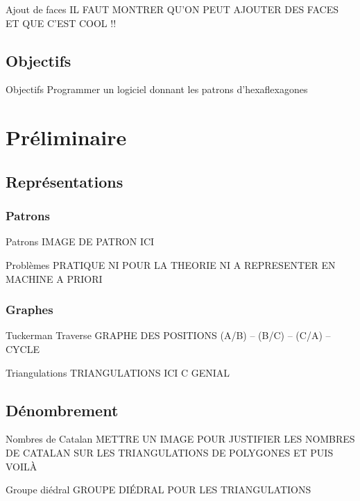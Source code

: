 \documentclass[french,xcolor=dvipsnames]{beamer}
\begin{document}
		\begin{frame}{Ajout de faces}
		IL FAUT MONTRER QU'ON PEUT AJOUTER DES FACES ET QUE C'EST COOL !!
		\end{frame}
		
		\subsection{Objectifs}
		\begin{frame}{Objectifs}
			Programmer un logiciel donnant les patrons d'hexaflexagones
		\end{frame}
		
		
	\section{Préliminaire}
	
		\subsection{Représentations}
		
		\subsubsection{Patrons}
		\begin{frame}{Patrons}
			IMAGE DE PATRON ICI
		\end{frame}
		
		\begin{frame}{Problèmes}
			PRATIQUE NI POUR LA THEORIE NI A REPRESENTER EN MACHINE A PRIORI
		\end{frame}
				
		\subsubsection{Graphes}
		\begin{frame}{Tuckerman Traverse}
			GRAPHE DES POSITIONS (A/B) -- (B/C) -- (C/A) -- CYCLE
		\end{frame}		
		
		\begin{frame}{Triangulations}
			TRIANGULATIONS ICI C GENIAL		
		\end{frame}
		
		\subsection{Dénombrement}
		\begin{frame}{Nombres de Catalan}
			METTRE UN IMAGE POUR JUSTIFIER LES NOMBRES DE CATALAN SUR LES TRIANGULATIONS DE POLYGONES ET PUIS VOILÀ
		\end{frame}
		\begin{frame}{Groupe diédral}
			GROUPE DIÉDRAL POUR LES TRIANGULATIONS
		\end{frame}
		
\end{document}
